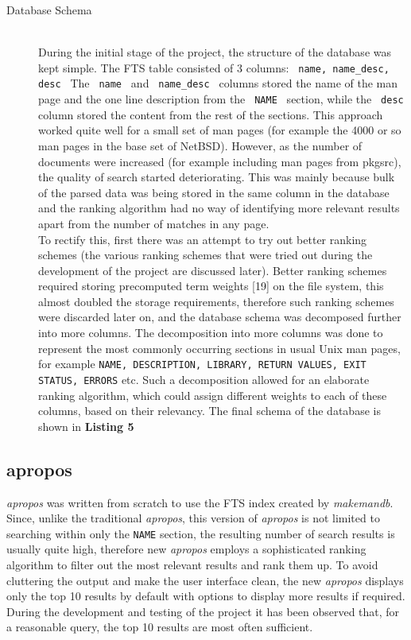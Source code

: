 \documentclass[letterpaper,twocolumn,10pt]{article}
\begin{document}
\begin{description}
\item[Database Schema] \hfill \\
During the initial stage of the project, the structure of the database was kept
simple. The FTS table consisted of 3 columns:
{\tt
name, name\_desc, desc
}
The
{\tt
name
}
and
{\tt
name\_desc
}
columns stored the name of the man page and the one line description from the
{\tt
NAME
}
section, while the
{\tt
desc
}
column stored the content from the rest of the sections. This approach worked
quite well for a small set of man pages (for example the 4000 or so man pages in
the base set of NetBSD). However, as the number of documents were increased (for example including man pages from pkgsrc), the quality of search started deteriorating. This was mainly because bulk of the parsed data was being stored
in the same column in the database and the ranking algorithm had no way of
identifying more relevant results apart from the number of matches in any page. \\

To rectify this, first there was an attempt to try out better ranking schemes
(the various ranking schemes that were tried out during the development of the
project are discussed later). Better ranking schemes required storing precomputed
term weights [19] on the file system, this almost doubled the storage requirements, therefore such ranking schemes were discarded later on, and the
database schema was decomposed further into more columns. The decomposition into
more columns was done to represent the most commonly occurring sections in usual Unix man pages, for example
{\tt NAME, DESCRIPTION, LIBRARY, RETURN VALUES, EXIT STATUS, ERRORS}
etc. Such a decomposition allowed for an elaborate ranking algorithm, which could
assign different weights to each of these columns, based on their relevancy. The
final schema of the database is shown in {\bf Listing 5}
\end{description}

\subsection{apropos}
\textit{apropos} was written from scratch to use the FTS index created by
\textit{makemandb}. Since, unlike the traditional \textit{apropos}, this version
of \textit{apropos} is not limited to searching within only the {\tt NAME}
section, the resulting
number of search results is usually quite high, therefore new \textit{apropos}
employs a
sophisticated ranking algorithm to filter out the most relevant results and rank
them up. To avoid cluttering the output and make the user interface clean, the
new \textit{apropos} displays only the top 10 results by default with options
to display more results if required. During the development and testing of the
project it has been observed that, for a reasonable query, the top 10 results
are most often sufficient. \\
\end{document}
